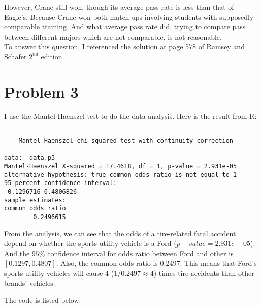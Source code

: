 \documentclass[12pt]{article}
\begin{document}
However, Crane still won, though its average pass rate is less than
that of Eagle's. Because Crane won both match-ups involving students
with supposedly comparable training. And what average pass rate did,
trying to compare pass between different majors which are not
comparable, is not reasonable.\\

\noindent * To answer this question, I referenced the solution at page
578 of Ramsey and Schafer $2^{nd}$ edition.

\section*{Problem 3}

I use the Mantel-Haenszel test to do the data analysis. Here is the
result from R:

\begin{verbatim}

	Mantel-Haenszel chi-squared test with continuity correction

data:  data.p3 
Mantel-Haenszel X-squared = 17.4618, df = 1, p-value = 2.931e-05
alternative hypothesis: true common odds ratio is not equal to 1 
95 percent confidence interval:
 0.1296716 0.4806826 
sample estimates:
common odds ratio 
        0.2496615 

\end{verbatim}

From the analysis, we can see that the odds of a tire-related fatal
accident depend on whether the sports utility vehicle is a Ford
($p-value = 2.931e-05$). And the $95\%$ confidence interval for odds
ratio between Ford and other is $[0.1297, 0.4807]$. Also, the common
odds ratio is 0.2497. This means that Ford's sports utility vehicles
will cause 4 ($1/0.2497 \approx 4$) times tire accidents than other
brands' vehicles.

\appendix
\appendixpage
\addappheadtotoc

The code is listed below:


\end{document}
